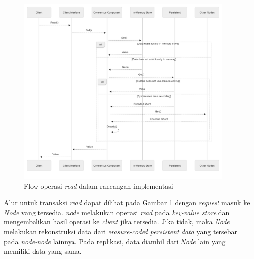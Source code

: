 \begin{figure}[!ht]
	\centering
	\includegraphics[width=0.95\textwidth]{resources/chapter-3/flow-read.png}
	\caption{Flow operasi \textit{read} dalam rancangan implementasi}
	\label{fig:flow-read-mermaidjs}
\end{figure}

Alur untuk transaksi \textit{read} dapat dilihat pada Gambar \ref{fig:flow-read-mermaidjs} dengan \textit{request} masuk ke \textit{Node} yang tersedia. \textit{node} melakukan operasi \textit{read} pada \textit{key-value store} dan mengembalikan hasil operasi ke \textit{client} jika tersedia. Jika tidak, maka \textit{Node} melakukan rekonstruksi data dari \textit{erasure-coded persistent data} yang tersebar pada \textit{node-node} lainnya. Pada replikasi, data diambil dari \textit{Node} lain yang memiliki data yang sama.